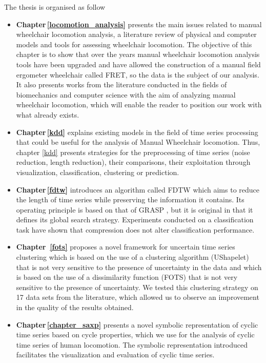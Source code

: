The thesis is organised as follow
\begin{itemize}
\item \textbf{Chapter\,\ref{locomotion_analysis}} presents the main issues related to manual wheelchair locomotion analysis, a literature review of physical and computer models and tools for assessing wheelchair locomotion. The objective of this chapter is to show that over the years manual wheelchair locomotion analysis tools have been upgraded and have allowed the construction of a manual field ergometer wheelchair called FRET, so the data is the subject of our analysis. It also presents works from the literature conducted in the fields of biomechanics and computer science with the aim of analyzing manual wheelchair locomotion, which will enable the reader to position our work with what already exists.


\item \textbf{Chapter\,\ref{kdd}} explains existing models in the field of time series processing that could be useful for the analysis of Manual Wheelchair locomotion. Thus, chapter \ref{kdd} presents strategies for the preprocessing of time series (noise reduction, length reduction), their comparisons, their exploitation through visualization, classification, clustering or prediction.
 
 
\item \textbf{Chapter\,\ref{fdtw}} introduces an algorithm called FDTW which aims to reduce the length of time series while preserving the information it contains. Its operating principle is based on that of GRASP , but it is original in that it defines its global search strategy. Experiments conducted on a classification task have shown that compression does not alter classification performance. 

\item \textbf{Chapter\, \ref{fots}} proposes a novel framework for uncertain time series clustering which is based on the use of a clustering algorithm (UShapelet) that is not very sensitive to the presence of uncertainty in the data and which is based on the use of a dissimilarity function (FOTS)  that is not very sensitive to the presence of uncertainty. We tested this clustering strategy on 17 data sets from the literature, which allowed us to observe an improvement in the quality of the results obtained.


\item \textbf{Chapter\,\ref{chapter_saxp}} presents a novel symbolic representation of cyclic time series based on cycle properties, which we use for the analysis of cyclic time series of human locomotion. The symbolic representation introduced facilitates the visualization and evaluation of cyclic time series.


\end{itemize}
